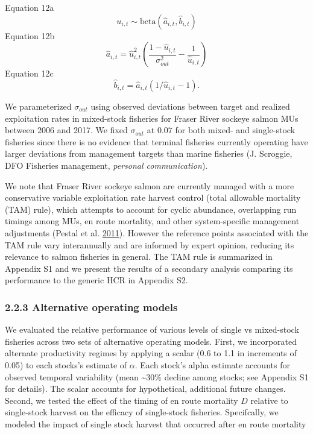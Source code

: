 \documentclass[11pt]{book}
\begin{document}
Equation 12a \[ u_{i,t} \sim \text{beta}(\hat{a}_{i,t}, \hat{b}_{i,t})\] Equation 12b \[ \hat{a}_{i,t} = \hat{u}_{i,t}^2 ({\frac{1 - \hat{u}_{i,t}} {\sigma_{out}^2}} - {\frac{1}{\hat{u}_{i,t}}}) \] Equation 12c \[ \hat{b}_{i,t} = \hat{a}_{i,t}(1 / \hat{u}_{i,t} - 1) .\]

We parameterized \(\sigma_{out}\) using observed deviations between target and realized exploitation rates in mixed-stock fisheries for Fraser River sockeye salmon MUs between 2006 and 2017. We fixed \(\sigma_{out}\) at \(0.07\) for both mixed- and single-stock fisheries since there is no evidence that terminal fisheries currently operating have larger deviations from management targets than marine fisheries (J. Scroggie, DFO Fisheries management, \emph{personal communication}).

We note that Fraser River sockeye salmon are currently managed with a more conservative variable exploitation rate harvest control (total allowable mortality (TAM) rule), which attempts to account for cyclic abundance, overlapping run timings among MUs, en route mortality, and other system-specific management adjustments (Pestal et al. \protect\hyperlink{ref-Pestal2011}{2011}). However the reference points associated with the TAM rule vary interannually and are informed by expert opinion, reducing its relevance to salmon fisheries in general. The TAM rule is summarized in Appendix S1 and we present the results of a secondary analysis comparing its performance to the generic HCR in Appendix S2.

\subsubsection{2.2.3 Alternative operating models}\label{alternative-operating-models}

We evaluated the relative performance of various levels of single vs mixed-stock fisheries across two sets of alternative operating models. First, we incorporated alternate productivity regimes by applying a scalar (0.6 to 1.1 in increments of 0.05) to each stocks's estimate of \(\alpha\). Each stock's alpha estimate accounts for observed temporal variability (mean \textasciitilde{}30\% decline among stocks; see Appendix S1 for details). The scalar accounts for hypothetical, additional future changes. Second, we tested the effect of the timing of en route mortality \(D\) relative to single-stock harvest on the efficacy of single-stock fisheries. Specifcally, we modeled the impact of single stock harvest that occurred after en route mortality
\end{document}
